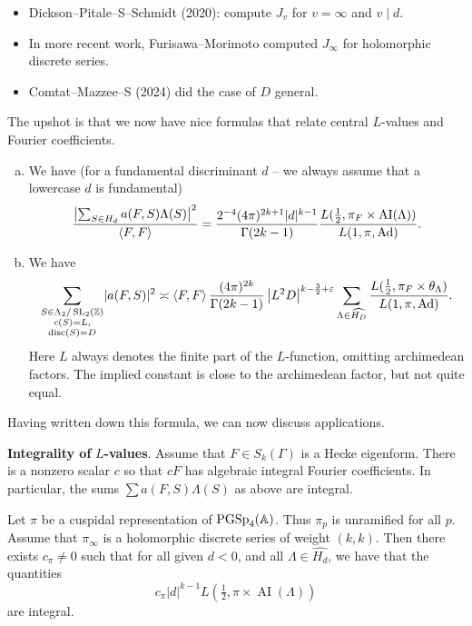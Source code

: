 \documentclass[reqno]{amsart} 
\begin{document}
\begin{itemize}
\item Dickson--Pitale--S--Schmidt (2020): compute $J_v$ for $v = \infty$ and $v \mid d$.
\item In more recent work, Furisawa--Morimoto computed $J_\infty$ for holomorphic discrete series.
\item Comtat--Mazzee--S (2024) did the case of $D$ general.
\end{itemize}
The upshot is that we now have nice formulas that relate central $L$-values and Fourier coefficients.
\begin{enumerate}[(a)]
\item We have (for a fundamental discriminant $d$ -- we always assume that a lowercase $d$ is fundamental)
  \begin{equation*}
    \frac{\left\lvert \sum_{S \in H_d} a(F, S) \Lambda(S) \right\rvert^2 }{\left\langle F, F \right\rangle} = \frac{2^{- 4}(4 \pi )^{2 k + 1} \lvert d \rvert^{k - 1}}{\Gamma(2 k - 1)} \frac{L(\tfrac{1}{2}, \pi_F \times \operatorname{AI}(\Lambda))}{L(1, \pi, \operatorname{Ad})}.
  \end{equation*}
\item We have
  \begin{equation*}
    \sum_{
      \substack{
        S \in \Lambda_2 / \operatorname{SL}_2(\mathbb{Z})  \\
        c(S) = L,  \\ \operatorname{disc}(S) = D        
      }
    }
    \lvert a(F, S) \rvert^2 \asymp \left\langle F, F \right\rangle
    \frac{(4 \pi )^{2 k }}{\Gamma(2 k - 1)}
    \left\lvert L^2 D \right\rvert^{k - \frac{3}{2} + \varepsilon }
    \sum_{\Lambda \in \widehat{H_D}} \frac{L(\tfrac{1}{2}, \pi_F \times \theta_\Lambda)}{L(1, \pi, \operatorname{Ad})}.
  \end{equation*}
  Here $L$ always denotes the finite part of the $L$-function, omitting archimedean factors.  The implied constant is close to the archimedean factor, but not quite equal.
\end{enumerate}

Having written down this formula, we can now discuss applications.

\textbf{Integrality of} $L$\textbf{-values}.  Assume that $F \in S_k(\Gamma)$ is a Hecke eigenform.  There is a nonzero scalar $c$ so that $c F$ has algebraic integral Fourier coefficients.  In particular, the sums $\sum a(F, S) \Lambda(S)$ as above are integral.
\begin{theorem}\label{theorem:cnfg5jynuf}
  Let $\pi$ be a cuspidal representation of $\operatorname{PGSp}_4(\mathbb{A})$.  Thus $\pi_p$ is unramified for all $p$.  Assume that $\pi _\infty $ is a holomorphic discrete series of weight $(k, k)$.  Then there exists $c_\pi \neq 0$ such that for all given $d< 0$, and all $\Lambda \in \widehat{H_d}$, we have that the quantities
  \begin{equation*}
    c_\pi \lvert d  \rvert^{k - 1} L(\tfrac{1}{2}, \pi \times \operatorname{AI}(\Lambda))
  \end{equation*}
  are integral.
\end{theorem}
\end{document}
